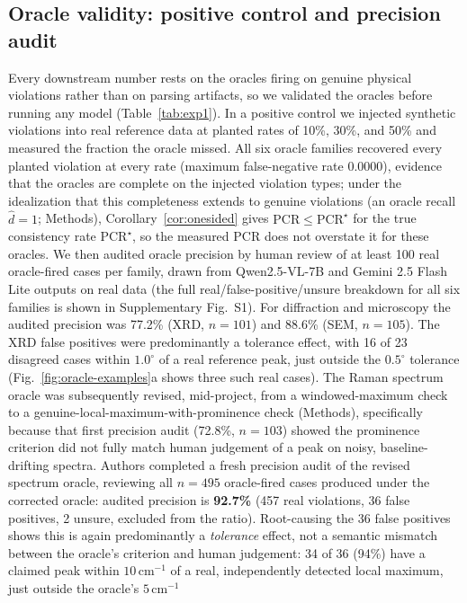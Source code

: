 \documentclass[pdflatex,sn-nature]{sn-jnl}
\begin{document}
\subsection*{Oracle validity: positive control and precision audit}
Every downstream number rests on the oracles firing on genuine physical violations
rather than on parsing artifacts, so we validated the oracles before running any model
(Table~\ref{tab:exp1}). In a positive control we injected synthetic violations into real
reference data at planted rates of 10\%, 30\%, and 50\% and measured the fraction the
oracle missed. All six oracle families recovered every planted violation at every rate
(maximum false-negative rate 0.0000), evidence that the oracles are complete on the
injected violation types; under the idealization that this completeness extends to
genuine violations (an oracle recall $\hat d=1$; Methods), Corollary~\ref{cor:onesided}
gives $\mathrm{PCR}\le\mathrm{PCR}^\star$ for the true consistency rate
$\mathrm{PCR}^\star$, so the measured PCR does not overstate it for these oracles. We then audited oracle precision by human review of
at least 100 real oracle-fired cases per family, drawn from Qwen2.5-VL-7B and Gemini 2.5
Flash Lite outputs on real data (the full real/false-positive/unsure breakdown for all six
families is shown in Supplementary Fig.~S1). For diffraction and microscopy the audited precision
was 77.2\% (XRD, $n=101$) and 88.6\% (SEM, $n=105$). The XRD
false positives were predominantly a tolerance effect, with 16 of 23 disagreed cases
within $1.0^\circ$ of a real reference peak, just outside the $0.5^\circ$ tolerance
(Fig.~\ref{fig:oracle-examples}a shows three such real cases). The Raman
spectrum oracle was subsequently revised, mid-project, from a windowed-maximum check to a
genuine-local-maximum-with-prominence check (Methods), specifically because that first
precision audit (72.8\%, $n=103$) showed the prominence criterion did not fully match human
judgement of a peak on noisy, baseline-drifting spectra. Authors completed a fresh
precision audit of the revised spectrum oracle, reviewing all $n=495$
oracle-fired cases produced under the corrected oracle: audited precision is
\textbf{92.7\%} (457 real violations, 36 false positives, 2 unsure, excluded from the
ratio). Root-causing the 36 false positives shows this is again predominantly a
\emph{tolerance} effect, not a semantic mismatch between the oracle's criterion and human
judgement: 34 of 36 (94\%) have a claimed peak within $10\,\mathrm{cm}^{-1}$ of a real,
independently detected local maximum, just outside the oracle's $5\,\mathrm{cm}^{-1}$
\end{document}
